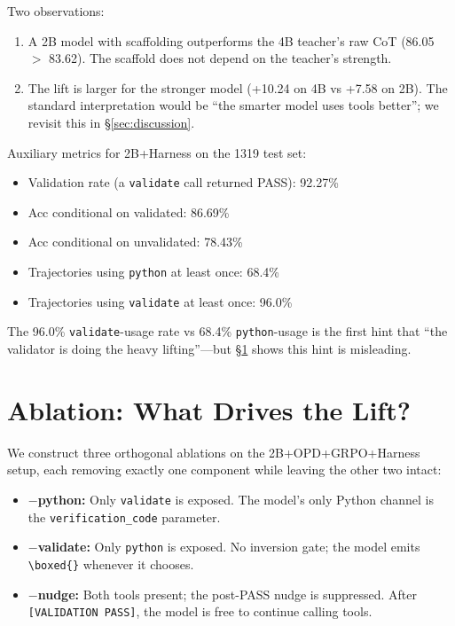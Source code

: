 \documentclass[10pt]{article}
\begin{document}
Two observations:
\begin{enumerate}
  \item A 2B model with scaffolding outperforms the 4B teacher's raw CoT (86.05 $>$ 83.62). The scaffold does not depend on the teacher's strength.
  \item The lift is larger for the stronger model (+10.24 on 4B vs +7.58 on 2B). The standard interpretation would be ``the smarter model uses tools better''; we revisit this in \S\ref{sec:discussion}.
\end{enumerate}

Auxiliary metrics for 2B+Harness on the 1319 test set:
\begin{itemize}
  \item Validation rate (a \texttt{validate} call returned PASS): 92.27\%
  \item Acc conditional on validated: 86.69\%
  \item Acc conditional on unvalidated: 78.43\%
  \item Trajectories using \texttt{python} at least once: 68.4\%
  \item Trajectories using \texttt{validate} at least once: 96.0\%
\end{itemize}

The 96.0\% \texttt{validate}-usage rate vs 68.4\% \texttt{python}-usage is the first hint that ``the validator is doing the heavy lifting''---but \S\ref{sec:ablation} shows this hint is misleading.

\section{Ablation: What Drives the Lift?}
\label{sec:ablation}

We construct three orthogonal ablations on the 2B+OPD+GRPO+Harness setup, each removing exactly one component while leaving the other two intact:
\begin{itemize}
  \item $-$\textbf{python:} Only \texttt{validate} is exposed. The model's only Python channel is the \texttt{verification\_code} parameter.
  \item $-$\textbf{validate:} Only \texttt{python} is exposed. No inversion gate; the model emits \texttt{\textbackslash boxed\{\}} whenever it chooses.
  \item $-$\textbf{nudge:} Both tools present; the post-PASS nudge is suppressed. After \texttt{[VALIDATION PASS]}, the model is free to continue calling tools.
\end{itemize}
\end{document}
